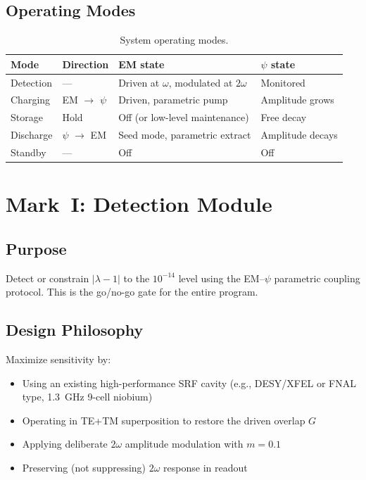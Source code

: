 \documentclass[11pt,a4paper]{article}
\begin{document}
\subsection{Operating Modes}

\begin{table}[h]
\centering
\caption{System operating modes.}
\label{tab:modes}
\begin{tabular}{@{}llll@{}}
\toprule
Mode & Direction & EM state & $\psi$ state \\
\midrule
Detection & --- & Driven at $\omega$, modulated at $2\omega$ & Monitored \\
Charging & EM $\to$ $\psi$ & Driven, parametric pump & Amplitude grows \\
Storage & Hold & Off (or low-level maintenance) & Free decay \\
Discharge & $\psi$ $\to$ EM & Seed mode, parametric extract & Amplitude decays \\
Standby & --- & Off & Off \\
\bottomrule
\end{tabular}
\end{table}

\section{Mark~I: Detection Module}

\subsection{Purpose}

Detect or constrain $|\lambda-1|$ to the $10^{-14}$ level using the
EM--$\psi$ parametric coupling protocol.  This is the go/no-go gate for
the entire program.

\subsection{Design Philosophy}

Maximize sensitivity by:
\begin{itemize}
\item Using an existing high-performance SRF cavity (e.g., DESY/XFEL
or FNAL type, 1.3~GHz 9-cell niobium)
\item Operating in TE+TM superposition to restore the driven overlap $G$
\item Applying deliberate $2\omega$ amplitude modulation with $m = 0.1$
\item Preserving (not suppressing) $2\omega$ response in readout
\end{itemize}
\end{document}

